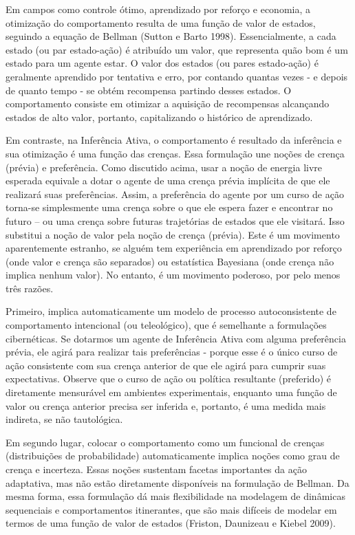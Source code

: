 \documentclass[
  12pt,
]{book}
\begin{document}
Em campos como controle ótimo, aprendizado por reforço e economia, a otimização do comportamento resulta de uma função de valor de estados, seguindo a equação de Bellman (Sutton e Barto 1998). Essencialmente, a cada estado (ou par estado-ação) é atribuído um valor, que representa quão bom é um estado para um agente estar. O valor dos estados (ou pares estado-ação) é geralmente aprendido por tentativa e erro, por contando quantas vezes - e depois de quanto tempo - se obtém recompensa partindo desses estados. O comportamento consiste em otimizar a aquisição de recompensas alcançando estados de alto valor, portanto, capitalizando o histórico de aprendizado.

Em contraste, na Inferência Ativa, o comportamento é resultado da inferência e sua otimização é uma função das crenças. Essa formulação une noções de crença (prévia) e preferência. Como discutido acima, usar a noção de energia livre esperada equivale a dotar o agente de uma crença prévia implícita de que ele realizará suas preferências. Assim, a preferência do agente por um curso de ação torna-se simplesmente uma crença sobre o que ele espera fazer e encontrar no futuro -- ou uma crença sobre futuras trajetórias de estados que ele visitará. Isso substitui a noção de valor pela noção de crença (prévia). Este é um movimento aparentemente estranho, se alguém tem experiência em aprendizado por reforço (onde valor e crença são separados) ou estatística Bayesiana (onde crença não implica nenhum valor). No entanto, é um movimento poderoso, por pelo menos três razões.

Primeiro, implica automaticamente um modelo de processo autoconsistente de comportamento intencional (ou teleológico), que é semelhante a formulações cibernéticas. Se dotarmos um agente de Inferência Ativa com alguma preferência prévia, ele agirá para realizar tais preferências - porque esse é o único curso de ação consistente com sua crença anterior de que ele agirá para cumprir suas expectativas. Observe que o curso de ação ou política resultante (preferido) é diretamente mensurável em ambientes experimentais, enquanto uma função de valor ou crença anterior precisa ser inferida e, portanto, é uma medida mais indireta, se não tautológica.

Em segundo lugar, colocar o comportamento como um funcional de crenças (distribuições de probabilidade) automaticamente implica noções como grau de crença e incerteza. Essas noções sustentam facetas importantes da ação adaptativa, mas não estão diretamente disponíveis na formulação de Bellman. Da mesma forma, essa formulação dá mais flexibilidade na modelagem de dinâmicas sequenciais e comportamentos itinerantes, que são mais difíceis de modelar em termos de uma função de valor de estados (Friston, Daunizeau e Kiebel 2009).
\end{document}
